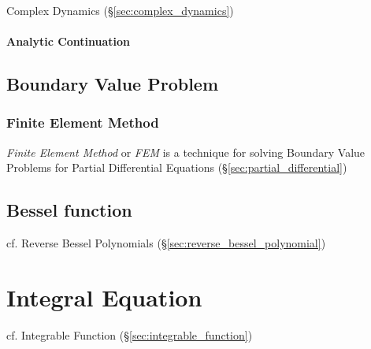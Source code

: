 Complex Dynamics (\S\ref{sec:complex_dynamics})



\paragraph{Analytic Continuation}\label{sec:analytic_continuation}



\subsection{Boundary Value Problem}\label{sec:boundary_value_problem}


\subsubsection{Finite Element Method}\label{sec:finite_element_method}

\emph{Finite Element Method} or \emph{FEM} is a technique for solving
Boundary Value Problems for Partial Differential Equations
(\S\ref{sec:partial_differential})



\subsection{Bessel function}\label{sec:bessel_function}

cf. Reverse Bessel Polynomials (\S\ref{sec:reverse_bessel_polynomial})



\section{Integral Equation}\label{sec:integral_equation}

cf. Integrable Function (\S\ref{sec:integrable_function})



